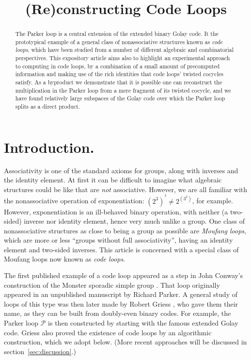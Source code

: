 \documentclass{article}
\theoremstyle{plain}
\theoremstyle{definition}
\def \cP {\mathcal{P}}
\begin{document}
\title{(Re)constructing Code Loops}
\author{%
}

\maketitle

\begin{abstract}
The Parker loop is a central extension of the extended binary Golay code. It the prototypical example of a general class of nonassociative structures known as \emph{code loops}, which have been studied from a number of different algebraic and combinatorial perspectives.
This expository article aims also to highlight an experimental approach to computing in code loops, by a combination of a small amount of precomputed information and making use of the rich identities that code loops' twisted cocycles satisfy.
As a byproduct we demonstrate that it is possible one can reconstruct the multiplication in the Parker loop from a mere fragment of its twisted cocycle, and we have found relatively large subspaces of the Golay code over which the Parker loop splits as a direct product.
\end{abstract}


\section{Introduction.}

Associativity is one of the standard axioms for groups, along with inverses and the identity element.
At first it can be difficult to imagine what algebraic structures could be like that are \emph{not} associative. 
However, we are all familiar with the nonassociative operation of exponentiation:  $(2^3)^{\!{}^2} \neq 2^{(3^2)}$, for example.
However, exponentiation is an ill-behaved binary operation, with neither (a two-sided) inverse nor identity element, hence very much unlike a group. 
One class of nonassociative structures as close to being a group as possible are \emph{Moufang loops}, which are more or less ``groups without full associativity'', having an identity element and two-sided inverses.
This article is concerned with a special class of Moufang loops now known as \emph{code loops}.

The first published example of a code loop appeared as a step in John Conway's construction of the Monster sporadic simple group \cite{Conway}. 
That loop originally appeared in an unpublished manuscript by Richard Parker.
A general study of loops of this type was then later made by Robert Griess \cite{Griess}, who gave them their name, as they can be built from doubly-even binary codes. 
For example, the Parker loop $\cP$ is then constructed by starting with the famous extended Golay code.
Griess also proved the existence of code loops by an algorithmic construction, which we adopt below.
(More recent approaches will be discussed in section~\ref{sec:discussion}.)
\end{document}
